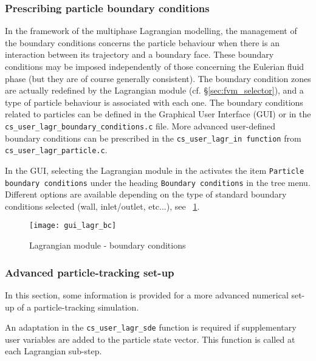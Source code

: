 \subsubsection{Prescribing particle boundary conditions}
In the framework of the multiphase Lagrangian modelling, the management of the boundary conditions concerns the particle behaviour when there is an interaction between its trajectory and a boundary face. These boundary conditions may be imposed independently of those concerning the Eulerian fluid phase (but they are of course generally consistent). The boundary condition zones are actually redefined by the Lagrangian module (cf. \S\ref{sec:fvm_selector}), and a type of particle behaviour is associated with each one. The boundary conditions related to particles can be defined in the Graphical User Interface (GUI) or in the \texttt{cs\_user\_lagr\_boundary\_conditions.c} file. More advanced user-defined boundary conditions can be prescribed in the \texttt{cs\_user\_lagr\_in function} from \texttt{cs\_user\_lagr\_particle.c}.


 In the GUI, selecting the Lagrangian module in the activates the item \texttt{Particle boundary conditions} under the heading \texttt{Boundary conditions} in the tree menu. Different options are available depending on the type of standard boundary conditions selected (wall, inlet/outlet, etc...),
 see \figurename~\ref{fig:CL-Lag}.

\begin{figure}[ht]
\begin{center}
\texttt{[image: gui\_lagr\_bc]}
\caption{Lagrangian module - boundary conditions}
\label{fig:CL-Lag}
\end{center}
\end{figure}

\subsubsection{Advanced particle-tracking set-up}

In this section, some information is provided for a more advanced numerical set-up of a particle-tracking simulation.


\noindent
An adaptation in the \texttt{cs\_user\_lagr\_sde} function is required if
supplementary user variables are added to the particle state vector.
This function is called at each Lagrangian sub-step.

